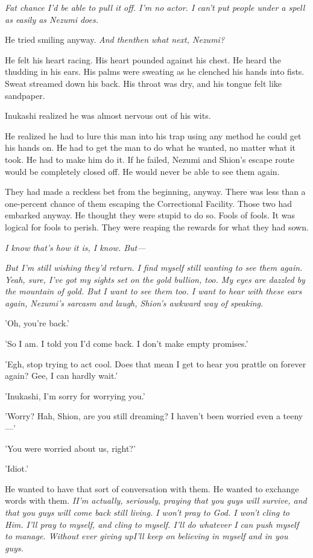 \emph{Fat chance I'd be able to pull it off. I'm no actor. I can't put people
under a spell as easily as Nezumi does.}

He tried smiling anyway. \emph{And then\el then what next, Nezumi?}

He felt his heart racing. His heart pounded against his chest. He heard
the thudding in his ears. His palms were sweating as he clenched his
hands into fists. Sweat streamed down his back. His throat was dry, and
his tongue felt like sandpaper.

Inukashi realized he was almost nervous out of his wits.

He realized he had to lure this man into his trap using any method he
could get his hands on. He had to get the man to do what he wanted, no
matter what it took. He had to make him do it. If he failed, Nezumi and
Shion's escape route would be completely closed off. He would never be
able to see them again.

They had made a reckless bet from the beginning, anyway. There was less
than a one-percent chance of them escaping the Correctional Facility.
Those two had embarked anyway. He thought they were stupid to do so.
Fools of fools. It was logical for fools to perish. They were reaping
the rewards for what they had sown.

\emph{I know that's how it is, I know. But---}

\emph{But I'm still wishing they'd return. I find myself still wanting to see
them again. Yeah, sure, I've got my sights set on the gold bullion, too.
My eyes are dazzled by the mountain of gold. But I want to see them too.
I want to hear with these ears again, Nezumi's sarcasm and laugh,
Shion's awkward way of speaking.}

'Oh, you're back.'

'So I am. I told you I'd come back. I don't make empty promises.'

'Egh, stop trying to act cool. Does that mean I get to hear you prattle
on forever again? Gee, I can hardly wait.'

'Inukashi, I'm sorry for worrying you.'

'Worry? Hah, Shion, are you still dreaming? I haven't been worried even
a teeny---'

'You were worried about us, right?'

'Idiot.'

He wanted to have that sort of conversation with them. He wanted to
exchange words with them. \emph{I\el I'm actually, seriously, praying that you
guys will survive, and that you guys will come back still living. I
won't pray to God. I won't cling to Him. I'll pray to myself, and cling
to myself. I'll do whatever I can push myself to manage. Without ever
giving up\el I'll keep on believing in myself and in you guys.}

